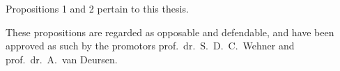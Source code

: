 \bigskip \noindent
Propositions 1 and 2 pertain to this thesis.

\bigskip \noindent
These propositions are regarded as opposable and defendable, and have been approved as such by the
promotors prof.\ dr.\ S.\ D.\ C.\ Wehner and prof.\ dr.\ A.\ van Deursen.
